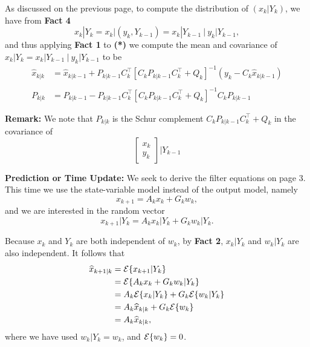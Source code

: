 \documentclass[letterpaper]{article}
\newcommand{\Expectof}[1]{{\cal E} \{ #1 \}}
\newcommand{\ExpectofGiven}[2]{{\cal E} \{ #1 | #2 \}}
\begin{document}
As discussed on the previous page, to compute the distribution of $(x_k| Y_k)$, we have from \textbf{Fact 4}
$$ x_k| Y_k = x_k\bigg| (y_k, Y_{k-1}) =  x_k|Y_{k-1} ~\bigg|~ y_k|Y_{k-1},$$
and thus applying \textbf{Fact 1}  to \textbf{(*)}
we compute the mean and covariance of $x_k | Y_k = x_k|Y_{k-1} ~\bigg|~ y_k|Y_{k-1}$ to be
\begin{align*}
\widehat{x}_{k|k}&=  \widehat{x}_{k|k-1} + P_{k|k-1}  C_k^\top \left[C_k P_{k|k-1} C_k^\top  + Q_k \right]^{-1} \left( y_k - C_k   \widehat{x}_{k|k-1} \right) \\
& \\
P_{k|k} &= P_{k|k-1} - P_{k|k-1} C_k^\top   \left[C_k P_{k|k-1} C_k^\top  + Q_k \right]^{-1} C_k  P_{k|k-1}
\end{align*}

\textbf{Remark:} We note that $P_{k|k}$ is the Schur complement $C_k P_{k|k-1} C_k^\top  + Q_k$ in the covariance of  $$ \left[ \begin{array}{c} x_k\\y_k \end{array} \right] | Y_{k-1}$$


\newpage

\noindent  \textbf{Prediction or Time Update:}   We seek to derive the filter equations on page 3. This time we use the state-variable model instead of the output model, namely
$$x_{k+1} = A_k x_k + G_k w_k,$$
and we are interested in the random vector
$$x_{k+1} | Y_k = A_k x_k|Y_k + G_kw_k |Y_k.$$

Because $x_k$ and $Y_k$ are both independent of $w_k$, by \textbf{Fact 2}, $x_k| Y_k$ and $w_k | Y_k$ are also independent. It follows that
\begin{align*}
\widehat{x}_{k+1|k}&=    \ExpectofGiven{x_{k+1}}{Y_k} \\
& =\ExpectofGiven{A_k x_k + G_k w_k}{Y_k} \\
& = A_k \ExpectofGiven{ x_k} {Y_k}  + G_k  \ExpectofGiven{ w_k}{Y_k} \\
&=  A_k \widehat{x}_{k|k}  +  G_k \Expectof{w_k} \\
& = A_k \widehat{x}_{k|k},
\end{align*}
where we have used $w_k | Y_k = w_k$, and $\Expectof{w_k}=0$.
\end{document}
